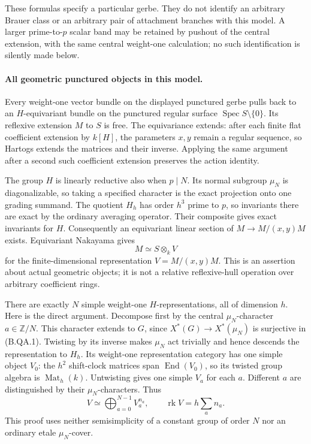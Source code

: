 These formulas specify a particular gerbe.  They do not identify an
arbitrary Brauer class or an arbitrary pair of attachment branches with
this model.  A larger prime-to-$p$ scalar band may be retained by
pushout of the central extension, with the same central weight-one
calculation; no such identification is silently made below.

\paragraph{All geometric punctured objects in this model.}
Every weight-one vector bundle on the displayed punctured gerbe pulls
back to an $H$-equivariant bundle on the punctured regular surface
$\operatorname{Spec}S\setminus\{0\}$.  Its reflexive extension $M$ to
$S$ is free.  The equivariance extends: after each finite flat
coefficient extension by $k[H]$, the parameters $x,y$ remain a regular
sequence, so Hartogs extends the matrices and their inverse.  Applying
the same argument after a second such coefficient extension preserves
the action identity.

The group $H$ is linearly reductive also when $p\mid N$.  Its normal
subgroup $\mu_N$ is diagonalizable, so taking a specified character
is the exact projection onto one grading summand.  The quotient $H_h$
has order $h^3$ prime to $p$, so invariants there are exact by the
ordinary averaging operator.  Their composite gives exact invariants
for $H$.  Consequently an equivariant linear section of
$M\to M/(x,y)M$ exists.  Equivariant Nakayama gives
\[
                       M\simeq S\otimes_k V           \tag{B.QA.3}
\]
for the finite-dimensional representation $V=M/(x,y)M$.
This is an assertion about actual geometric objects; it is not a
relative reflexive-hull operation over arbitrary coefficient rings.

There are exactly $N$ simple weight-one $H$-representations, all of
dimension $h$.  Here is the direct argument.  Decompose first by the
central $\mu_N$-character $a\in\mathbb Z/N$.  This character extends
to $G$, since $X^*(G)\to X^*(\mu_N)$ is surjective in (B.QA.1).
Twisting by its inverse makes $\mu_N$ act trivially and hence descends
the representation to $H_h$.  Its weight-one representation category
has one simple object $V_0$: the $h^2$ shift-clock matrices span
$\operatorname{End}(V_0)$, so its twisted group algebra is
$\operatorname{Mat}_h(k)$.  Untwisting gives one simple $V_a$ for
each $a$.  Different $a$ are distinguished by their $\mu_N$-characters.
Thus
\[
 V\simeq\bigoplus_{a=0}^{N-1}V_a^{n_a},\qquad
                \operatorname{rk}V=h\sum_a n_a.        \tag{B.QA.4}
\]
This proof uses neither semisimplicity of a constant group of order
$N$ nor an ordinary etale $\mu_N$-cover.

